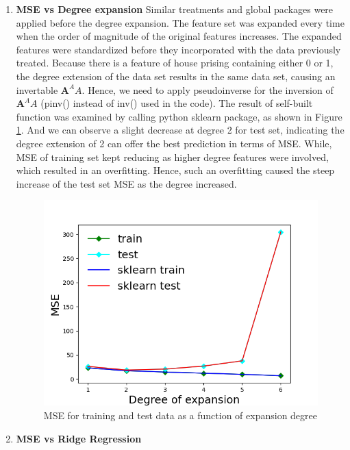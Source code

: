 \documentclass[11pt]{article}
\newcommand{\mfile}[1]  {{\small }} %
\newcommand{\mtx}[1]{\mathbf{#1}}
\def \mA {\mtx{A}}
\begin{document}
\begin{enumerate}
	\mfile{prob4-2.txt}
	\item {\bf MSE vs Degree expansion} Similar treatments and global packages were applied before the degree expansion. The feature set was expanded every time when the order of magnitude of the original features increases. The expanded features were standardized before they incorporated with the data previously treated. Because there is a feature of house prising containing either 0 or 1, the degree extension of the data set results in the same data set, causing an invertable $\mA^{A}A$. Hence, we need to apply pseudoinverse for the inversion of $\mA^{A}A$ (pinv() instead of inv() used in the code). The result of self-built function was examined by calling python sklearn package, as shown in Figure \ref{fig:p4-3}. And we can observe a slight decrease at degree 2 for test set, indicating the degree extension of 2 can offer the best prediction in terms of MSE. While, MSE of training set kept reducing as higher degree features were involved, which resulted in an overfitting. Hence, such an overfitting caused the steep increase of the test set MSE as the degree increased.
	\begin{figure}
		\centering\includegraphics[width=.75\linewidth]{4_3_fig.png}
		\caption{MSE for training and test data as a function of expansion degree} %
		\label{fig:p4-3}  %
	\end{figure}
	\mfile{prob4-3.txt}
	\item {\bf MSE vs Ridge Regression}

\end{enumerate}
\end{document}
